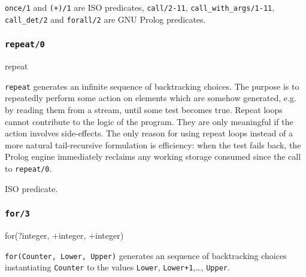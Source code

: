 \Portability

\texttt{once/1} and \texttt{({\bs}+)/1} are ISO predicates, \texttt{call/2-11}, \texttt{call\_with\_args/1-11}, \texttt{call\_det/2} and \texttt{forall/2} are GNU Prolog predicates.

\subsubsection{\texttt{repeat/0}}

\begin{TemplatesOneCol}
repeat

\end{TemplatesOneCol}

\Description

\texttt{repeat} generates an infinite sequence of backtracking choices. The
purpose is to repeatedly perform some action on elements which are somehow
generated, e.g. by reading them from a stream, until some test becomes true.
Repeat loops cannot contribute to the logic of the program. They are only
meaningful if the action involves side-effects. The only reason for using
repeat loops instead of a more natural tail-recursive formulation is
efficiency: when the test fails back, the Prolog engine immediately reclaims
any working storage consumed since the call to \texttt{repeat/0}.

\PlErrorsNone

\Portability

ISO predicate. 

\subsubsection{\texttt{for/3}}

\begin{TemplatesOneCol}
for(?integer, +integer, +integer)

\end{TemplatesOneCol}

\Description

\texttt{for(Counter, Lower, Upper)} generates an sequence of backtracking
choices instantiating \texttt{Counter} to the values \texttt{Lower},
\texttt{Lower+1},\ldots, \texttt{Upper}. 

\begin{PlErrors}






\end{PlErrors}

